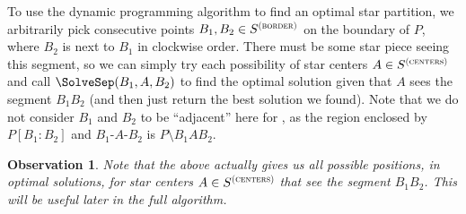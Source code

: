 \documentclass[10pt,a4paper]{article}
\newtheorem{observation}{Observation}[section]
\newcommand\Scen{S^{\textsc{(centers)}}}
\newcommand\Sbor{S^{\textsc{(border)}}}
\begin{document}

To use the dynamic programming algorithm to find an optimal star partition, we arbitrarily pick consecutive points $B_1, B_2\in \Sbor$ on the boundary of $P$, where $B_2$ is next to $B_1$ in clockwise order. 
There must be some star piece seeing this segment, so we can simply try each possibility of star centers $A\in \Scen$ and call $\SolveSep(B_1,A,B_2)$ to find the optimal solution given that $A$ sees the segment $B_1B_2$ (and then just return the best solution we found). 
Note that we do not consider $B_1$ and $B_2$ to be ``adjacent'' here for , as the region enclosed by $P[B_1:B_2]$ and $B_1$-$A$-$B_2$ is $P \setminus B_1AB_2$. 

\begin{observation}
\label{obs:multiple-solutions}
Note that the above actually gives us all possible positions, in optimal solutions, for star centers $A\in\Scen$ that see the segment $B_1B_2$. This will be useful later in the full algorithm.
\end{observation}
\end{document}
